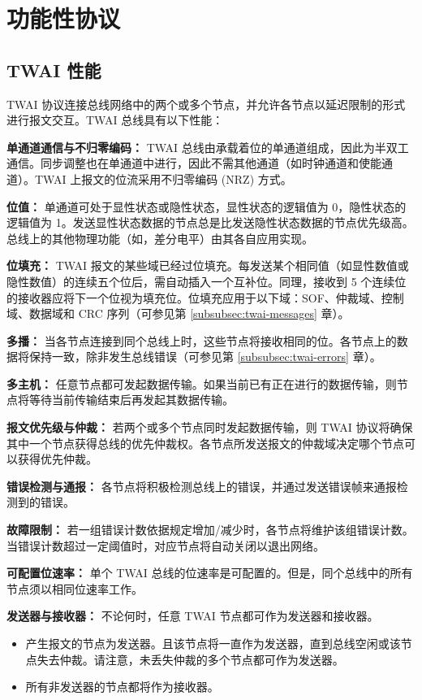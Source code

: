 \documentclass[main\_\_CN.tex]{subfiles}
\begin{document}
\section{功能性协议}
\label{subsec:protocol-description}
\subsection{TWAI 性能}
TWAI 协议连接总线网络中的两个或多个节点，并允许各节点以延迟限制的形式进行报文交互。TWAI 总线具有以下性能：

{\bfseries 单通道通信与不归零编码：} TWAI 总线由承载着位的单通道组成，因此为半双工通信。同步调整也在单通道中进行，因此不需其他通道（如时钟通道和使能通道）。TWAI 上报文的位流采用不归零编码 (NRZ) 方式。

{\bfseries 位值：} 单通道可处于显性状态或隐性状态，显性状态的逻辑值为 0，隐性状态的逻辑值为 1。发送显性状态数据的节点总是比发送隐性状态数据的节点优先级高。总线上的其他物理功能（如，差分电平）由其各自应用实现。

{\bfseries 位填充：} TWAI 报文的某些域已经过位填充。每发送某个相同值（如显性数值或隐性数值）的连续五个位后，需自动插入一个互补位。同理，接收到 5 个连续位的接收器应将下一个位视为填充位。位填充应用于以下域：SOF、仲裁域、控制域、数据域和 CRC 序列（可参见第 \ref{subsubsec:twai-messages} 章）。

{\bfseries 多播：} 当各节点连接到同个总线上时，这些节点将接收相同的位。各节点上的数据将保持一致，除非发生总线错误（可参见第 \ref{subsubsec:twai-errors} 章）。

{\bfseries 多主机：} 任意节点都可发起数据传输。如果当前已有正在进行的数据传输，则节点将等待当前传输结束后再发起其数据传输。

{\bfseries 报文优先级与仲裁：} 若两个或多个节点同时发起数据传输，则 TWAI 协议将确保其中一个节点获得总线的优先仲裁权。各节点所发送报文的仲裁域决定哪个节点可以获得优先仲裁。

{\bfseries 错误检测与通报：} 各节点将积极检测总线上的错误，并通过发送错误帧来通报检测到的错误。

{\bfseries 故障限制：} 若一组错误计数依据规定增加/减少时，各节点将维护该组错误计数。当错误计数超过一定阈值时，对应节点将自动关闭以退出网络。

{\bfseries 可配置位速率：} 单个 TWAI 总线的位速率是可配置的。但是，同个总线中的所有节点须以相同位速率工作。

{\bfseries 发送器与接收器：} 不论何时，任意 TWAI 节点都可作为发送器和接收器。
\begin{itemize}
    \item 产生报文的节点为发送器。且该节点将一直作为发送器，直到总线空闲或该节点失去仲裁。请注意，未丢失仲裁的多个节点都可作为发送器。
    \item 所有非发送器的节点都将作为接收器。
\end{itemize}
\end{document}
